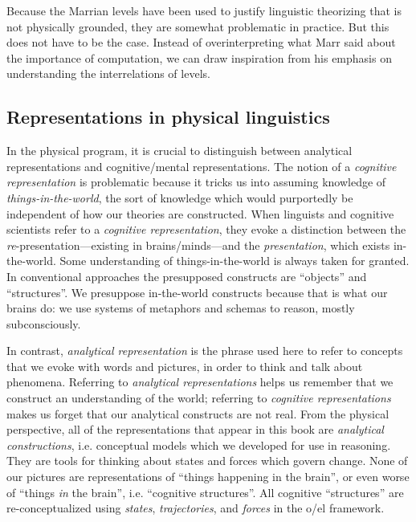   Because the Marrian levels have been used to justify linguistic theorizing that is not physically grounded, they are somewhat problematic in practice. But this does not have to be the case. Instead of overinterpreting what Marr said about the importance of computation, we can draw inspiration from his emphasis on understanding the interrelations of levels. 

\subsection{Representations in physical linguistics}

In the physical program, it is crucial to distinguish between analytical representations and cognitive/mental representations. The notion of a \textit{cognitive representation} is problematic because it tricks us into assuming knowledge of \textit{things-in-the-world}, the sort of knowledge which would purportedly be independent of how our theories are constructed. When linguists and cognitive scientists refer to a \textit{cognitive representation}, they evoke a distinction between the \textit{re}{}-presentation—existing in brains/minds—and the \textit{presentation}, which exists in-the-world. Some understanding of things-in-the-world is always taken for granted. In conventional approaches the presupposed constructs are “objects” and “structures”. We presuppose in-the-world constructs because that is what our brains do: we use systems of metaphors and schemas to reason, mostly subconsciously. 

  In contrast, \textit{analytical representation} is the phrase used here to refer to concepts that we evoke with words and pictures, in order to think and talk about phenomena. Referring to \textit{analytical representations} helps us remember that we construct an understanding of the world; referring to \textit{cognitive representations} makes us forget that our analytical constructs are not real. From the physical perspective, all of the representations that appear in this book are \textit{analytical constructions}, i.e. conceptual models which we developed for use in reasoning. They are tools for thinking about states and forces which govern change. None of our pictures are representations of “things happening in the brain”, or even worse of “things \textit{in} the brain”, i.e. “cognitive structures”. All cognitive “structures” are re-conceptualized using \textit{states}, \textit{trajectories}, and \textit{forces} in the o/el framework. 

